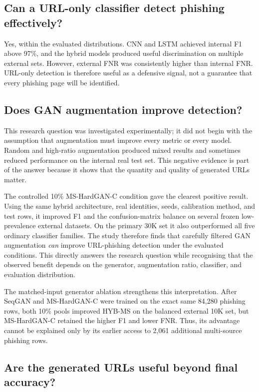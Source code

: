 \subsection{Can a URL-only classifier detect phishing effectively?}

Yes, within the evaluated distributions. CNN and LSTM achieved internal F1
above 97\%, and the hybrid models produced useful discrimination on multiple
external sets. However, external FNR was consistently higher than internal FNR.
URL-only detection is therefore useful as a defensive signal, not a guarantee
that every phishing page will be identified.

\subsection{Does GAN augmentation improve detection?}

This research question was investigated experimentally; it did not begin with
the assumption that augmentation must improve every metric or every model.
Random and high-ratio augmentation produced mixed results and sometimes reduced
performance on the internal real test set. This negative evidence is part of
the answer because it shows that the quantity and quality of generated URLs
matter.

The controlled 10\% MS-HardGAN-C condition gave the clearest positive result.
Using the same hybrid architecture, real identities, seeds, calibration method,
and test rows, it improved F1 and the confusion-matrix balance on several frozen
low-prevalence external datasets. On the primary 30K set it also outperformed
all five ordinary classifier families. The study therefore finds that carefully
filtered GAN augmentation \emph{can} improve URL-phishing detection under the
evaluated conditions. This directly answers the research question while
recognising that the observed benefit depends on the generator, augmentation
ratio, classifier, and evaluation distribution.

The matched-input generator ablation strengthens this interpretation. After
SeqGAN and MS-HardGAN-C were trained on the exact same 84,280 phishing rows,
both 10\% pools improved HYB-MS on the balanced external 10K set, but
MS-HardGAN-C retained the higher F1 and lower FNR. Thus, its advantage cannot
be explained only by its earlier access to 2,061 additional multi-source
phishing rows.

\subsection{Are the generated URLs useful beyond final accuracy?}

